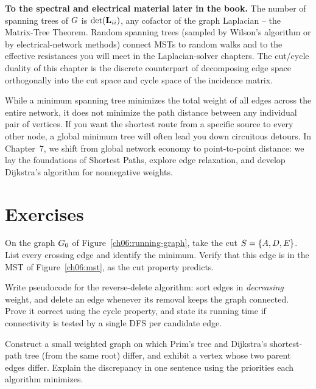 \begin{connectionbox}
\textbf{To the spectral and electrical material later in the book.} The number of spanning trees of $G$ is $\det(\mathbf{L}_{ii})$, any cofactor of the graph Laplacian -- the Matrix-Tree Theorem. Random spanning trees (sampled by Wilson's algorithm or by electrical-network methods) connect MSTs to random walks and to the effective resistances you will meet in the Laplacian-solver chapters. The cut/cycle duality of this chapter is the discrete counterpart of decomposing edge space orthogonally into the cut space and cycle space of the incidence matrix.

While a minimum spanning tree minimizes the total weight of all edges across the entire network, it does not minimize the path distance between any individual pair of vertices. If you want the shortest route from a specific source to every other node, a global minimum tree will often lead you down circuitous detours. In Chapter~7, we shift from global network economy to point-to-point distance: we lay the foundations of Shortest Paths, explore edge relaxation, and develop Dijkstra's algorithm for nonnegative weights.
\end{connectionbox}

\section*{Exercises}

\begin{exercise}
On the graph $G_0$ of Figure~\ref{ch06:running-graph}, take the cut $S=\{A,D,E\}$. List every crossing edge and identify the minimum. Verify that this edge is in the MST of Figure~\ref{ch06:mst}, as the cut property predicts.
\end{exercise}

\begin{exercise}
Write pseudocode for the reverse-delete algorithm: sort edges in \emph{decreasing} weight, and delete an edge whenever its removal keeps the graph connected. Prove it correct using the cycle property, and state its running time if connectivity is tested by a single DFS per candidate edge.
\end{exercise}

\begin{exercise}
Construct a small weighted graph on which Prim's tree and Dijkstra's shortest-path tree (from the same root) differ, and exhibit a vertex whose two parent edges differ. Explain the discrepancy in one sentence using the priorities each algorithm minimizes.
\end{exercise}

